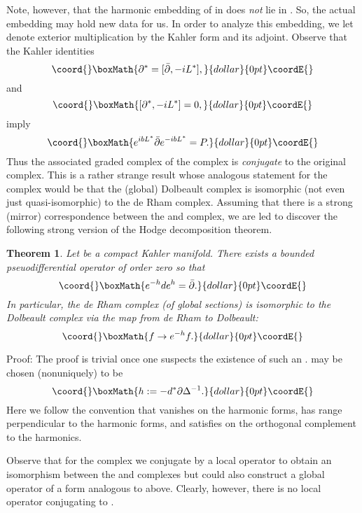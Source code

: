 \documentclass[a4paper,11pt]{amsart}
\providecommand{\db}{\bar{\partial}}
\providecommand{\p}{\partial}
\newtheorem{theorem}{Theorem}[section]
\begin{document}
Note, however, that the harmonic embedding of \coordHE{} in 
\coordHE{} does {\em not} lie in \coordHE{}. So, the actual
 embedding may hold new data for us.
   In order to analyze this embedding, we let \coordHE{} denote exterior multiplication 
 by the Kahler form and \coordHE{} its adjoint. Observe that the Kahler identities
   $$\coord{}\boxMath{\partial^* = [\db,-iL^*],}{dollar}{0pt}\coordE{}$$
   and
    $$\coord{}\boxMath{[\partial^*,-iL^*] = 0,}{dollar}{0pt}\coordE{}$$
 imply 
$$\coord{}\boxMath{e^{ibL^*}\db e^{-ibL^*} = P.}{dollar}{0pt}\coordE{}$$
Thus the associated graded complex of the \coordHE{} complex is {\em conjugate} to the 
original \coordHE{} complex. This is a rather strange result whose analogous 
statement for the \coordHE{} complex would be that the (global) Dolbeault complex is isomorphic 
(not even just quasi-isomorphic) to the de Rham complex. Assuming that there is a
 strong (mirror) correspondence between the \coordHE{} and \coordHE{} complex, we are led to
  discover the following strong version of the Hodge decomposition theorem. 
\begin{theorem}
Let \coordHE{} be a compact Kahler manifold. 
There exists a bounded pseuodifferential operator \coordHE{} of order zero 
so that 
$$\coord{}\boxMath{e^{-h}de^{h} = \db.}{dollar}{0pt}\coordE{}$$
In particular, the de Rham complex (of global sections) is isomorphic to the Dolbeault complex 
via the map from de Rham to Dolbeault:
$$\coord{}\boxMath{f\rightarrow e^{-h}f.}{dollar}{0pt}\coordE{}$$
\end{theorem}
\noindent
Proof: The proof is trivial once one suspects the existence of such an \coordHE{}. 
\coordHE{} may be chosen (nonuniquely) to be  
$$\coord{}\boxMath{h := -d^*\p\Delta^{-1}.}{dollar}{0pt}\coordE{}$$
Here we follow the convention that \coordHE{} vanishes on the harmonic 
forms, has range perpendicular to the harmonic forms, and satisfies 
\coordHE{} on the orthogonal complement to the 
harmonics. \myHighlight{$\blacksquare$}\coordHE{}


Observe that for the \coordHE{} complex we conjugate by a local operator to obtain an
isomorphism between the \myHighlight{$\db$}\coordHE{} and \coordHE{} complexes but 
could also construct a global operator of a form analogous to \coordHE{} above. 
Clearly, however, there is no local operator conjugating \coordHE{} to \myHighlight{$\db$}\coordHE{}. 
\end{document}

